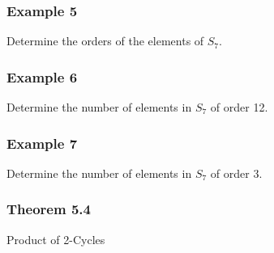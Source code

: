 \documentclass{beamer}
\begin{document}
\begin{frame}
    \frametitle{Example 5}

    Determine the orders of the elements of \(S_7\). 

\end{frame}

\begin{frame}
    \frametitle{Example 6}

    Determine the number of elements in \(S_7\) of order 12. 

\end{frame}

\begin{frame}
    \frametitle{Example 7}

    Determine the number of elements in \(S_7\) of order \(3\). 

\end{frame}

\begin{frame}
    \frametitle{Theorem 5.4}
    \begin{block}{Product of 2-Cycles}
                
    \end{block}

    

\end{frame}
\end{document}
